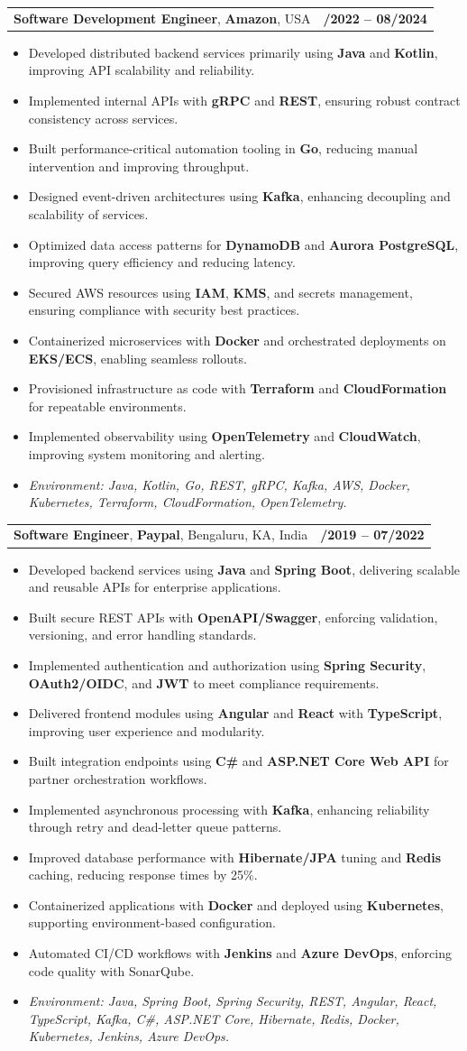 \documentclass[letterpaper,11pt]{article}
\makeatletter
\newcommand{\resumeItem}[1]{
  \item\footnotesize{
    {#1 \vspace{-2pt}}
  }
}
\newcommand{\resumeSubheading}[4]{
  \vspace{-2pt}\item
    \begin{tabular*}{1.0\textwidth}[t]{l@{\extracolsep{\fill}}r}
      \textbf{\fontsize{10pt}{14pt}\selectfont #3}, \textbf{\fontsize{10pt}{14pt}\selectfont #1}, \fontsize{10pt}{14pt}\selectfont #4 & \textbf{\fontsize{10pt}{14pt}\selectfont #2} \\
    \end{tabular*}\vspace{-7pt}
}
\newcommand{\resumeItemListStart}{\begin{itemize}[leftmargin=*]}
\newcommand{\resumeItemListEnd}{\end{itemize}\vspace{-5pt}}
\makeatother
\begin{document}
\resumeSubheading
{Amazon}{10/2022 -- 08/2024}
{Software Development Engineer}{USA}
\resumeItemListStart
  \resumeItem{Developed distributed backend services primarily using \textbf{Java} and \textbf{Kotlin}, improving API scalability and reliability.}
  \resumeItem{Implemented internal APIs with \textbf{gRPC} and \textbf{REST}, ensuring robust contract consistency across services.}
  \resumeItem{Built performance-critical automation tooling in \textbf{Go}, reducing manual intervention and improving throughput.}
  \resumeItem{Designed event-driven architectures using \textbf{Kafka}, enhancing decoupling and scalability of services.}
  \resumeItem{Optimized data access patterns for \textbf{DynamoDB} and \textbf{Aurora PostgreSQL}, improving query efficiency and reducing latency.}
  \resumeItem{Secured AWS resources using \textbf{IAM}, \textbf{KMS}, and secrets management, ensuring compliance with security best practices.}
  \resumeItem{Containerized microservices with \textbf{Docker} and orchestrated deployments on \textbf{EKS/ECS}, enabling seamless rollouts.}
  \resumeItem{Provisioned infrastructure as code with \textbf{Terraform} and \textbf{CloudFormation} for repeatable environments.}
  \resumeItem{Implemented observability using \textbf{OpenTelemetry} and \textbf{CloudWatch}, improving system monitoring and alerting.}
  \resumeItem{\textit{Environment: Java, Kotlin, Go, REST, gRPC, Kafka, AWS, Docker, Kubernetes, Terraform, CloudFormation, OpenTelemetry.}}
\resumeItemListEnd

\resumeSubheading
{Paypal}{08/2019 -- 07/2022}
{Software Engineer}{Bengaluru, KA, India}
\resumeItemListStart
  \resumeItem{Developed backend services using \textbf{Java} and \textbf{Spring Boot}, delivering scalable and reusable APIs for enterprise applications.}
  \resumeItem{Built secure REST APIs with \textbf{OpenAPI/Swagger}, enforcing validation, versioning, and error handling standards.}
  \resumeItem{Implemented authentication and authorization using \textbf{Spring Security}, \textbf{OAuth2/OIDC}, and \textbf{JWT} to meet compliance requirements.}
  \resumeItem{Delivered frontend modules using \textbf{Angular} and \textbf{React} with \textbf{TypeScript}, improving user experience and modularity.}
  \resumeItem{Built integration endpoints using \textbf{C\#} and \textbf{ASP.NET Core Web API} for partner orchestration workflows.}
  \resumeItem{Implemented asynchronous processing with \textbf{Kafka}, enhancing reliability through retry and dead-letter queue patterns.}
  \resumeItem{Improved database performance with \textbf{Hibernate/JPA} tuning and \textbf{Redis} caching, reducing response times by 25\%.}
  \resumeItem{Containerized applications with \textbf{Docker} and deployed using \textbf{Kubernetes}, supporting environment-based configuration.}
  \resumeItem{Automated CI/CD workflows with \textbf{Jenkins} and \textbf{Azure DevOps}, enforcing code quality with SonarQube.}
  \resumeItem{\textit{Environment: Java, Spring Boot, Spring Security, REST, Angular, React, TypeScript, Kafka, C\#, ASP.NET Core, Hibernate, Redis, Docker, Kubernetes, Jenkins, Azure DevOps.}}
\resumeItemListEnd
\end{document}

